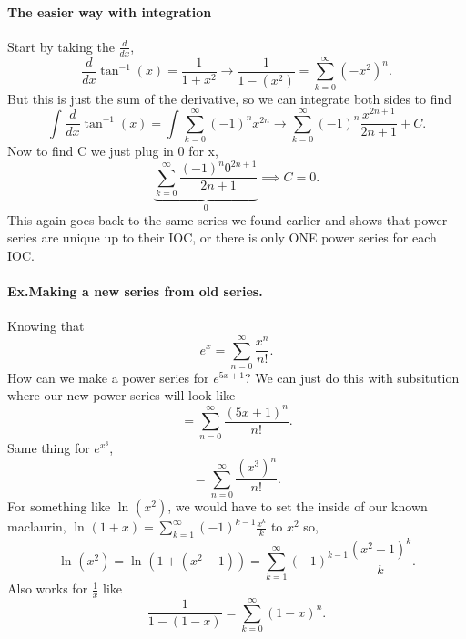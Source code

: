 	\paragraph{The easier way with integration}
	Start by taking the $ \frac{ d }{ dx }  $,
	\[
	\frac{ d }{ dx } \tan^{ -1 } \left( x \right) = \frac{ 1 }{ 1+x^2 } \to \frac{ 1 }{ 1-\left( x^2 \right)  } = \sum_{ k=0 } ^{ \infty } \left( -x^2 \right) ^{ n }
	.\] 
	But this is just the sum of the derivative, so we can integrate both sides to find
	\[
	\int_{  }^{  } \frac{ d }{ dx } \tan^{ -1 } \left( x \right) =\int_{  }^{  } \sum_{ k=0 } ^{ \infty } \left( -1 \right) ^{ n }x^{ 2n } \to \sum_{ k=0 } ^{ \infty } \left( -1 \right) ^{ n }\frac{ x^{ 2n+1 } }{ 2n+1 }+C
	.\] 
	Now to find C we just plug in 0 for x,
	\[
	\underbrace{ \sum_{ k=0 } ^{ \infty } \frac{ \left( -1 \right) ^{ n }0^{ 2n+1 } }{ 2n+1 } }_{ 0 } \implies C = 0
	.\] 
	This again goes back to the same series we found earlier and shows that power series are unique up to their IOC, or there is only ONE power series for each IOC. 
	\paragraph{Ex.Making a new series from old series.}
	Knowing that \[
	e^{ x }=\sum_{ n=0 } ^{ \infty } \frac{ x^{ n } }{ n! }
	.\] 
	How can we make a power series for $ e^{ 5x+1 } $?
	We can just do this with subsitution where our new power series will look like 
	\[
=	\sum_{ n=0 } ^{ \infty } \frac{ \left( 5x+1 \right) ^{ n } }{ n! }
	.\] 
	Same thing for $ e^{ x^{ 3 } } $,
	\[
	=\sum_{ n=0 } ^{ \infty } \frac{ \left( x^3 \right) ^{ n } }{ n! }
	.\] 
	For something like $ \ln^{  } \left( x^2 \right)  $, we would have to set the inside of our known  maclaurin, $ \ln^{  } \left( 1+x \right) =\sum_{ k=1 } ^{ \infty } \left( -1 \right) ^{ k-1 }\frac{ x^{ k } }{ k } $ to $ x^2 $ so,
	\[
	\ln^{  } \left( x^2 \right) = \ln^{  } \left( 1+\left( x^2-1 \right)  \right) = \sum_{ k=1 } ^{ \infty } \left( -1 \right) ^{ k-1 }\frac{ \left( x^2-1 \right) ^{ k } }{ k }
	.\] 
	Also works for $ \frac{ 1 }{ x }  $ like
	\[
	\frac{ 1 }{ 1-\left( 1-x \right)  } = \sum_{ k=0 } ^{ \infty } \left( 1-x \right) ^{ n }
	.\] 
